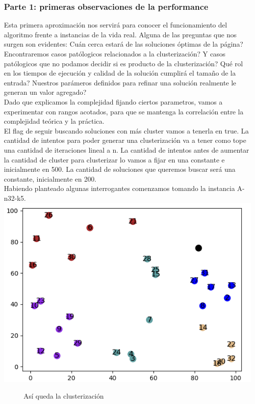 \documentclass[11pt,a4paper]{article}
\begin{document}
\subsubsection{Parte 1: primeras observaciones de la performance}
Esta primera aproximación nos servirá para conocer el funcionamiento del algoritmo frente a instancias de la vida real. Alguna de las preguntas que nos surgen son evidentes: Cuán cerca estará de las soluciones óptimas de la página? Encontraremos casos patólogicos relacionados a la clusterización? Y casos patólogicos que no podamos decidir si es producto de la clusterización? Qué rol en los tiempos de ejecución y calidad de la solución cumplirá el tamaño de la entrada? Nuestros parámeros definidos para refinar una solución realmente le generan un valor agregado?\\
Dado que explicamos la complejidad fijando ciertos parametros, vamos a experimentar con rangos acotados, para que se mantenga la correlación entre la complejidad teórica y la práctica. \\
El flag de seguir buscando soluciones con más cluster vamos a tenerla en true. La cantidad de intentos para poder generar una clusterización va a tener como tope una cantidad de iteraciones lineal a n. La cantidad de intentos antes de aumentar la cantidad de cluster para clusterizar lo vamos a fijar en una constante e inicialmente en 500. La cantidad de soluciones que queremos buscar será una constante, inicialmente en 200.\\
Habiendo planteado algunas interrogantes comenzamos tomando la instancia A-n32-k5. 
\centering
\includegraphics[scale=.5]{graficos/A-n32-k5/cluster.png}
\begin{figure}[!h]
\caption{Así queda la clusterización}
\end{figure}
\end{document}
